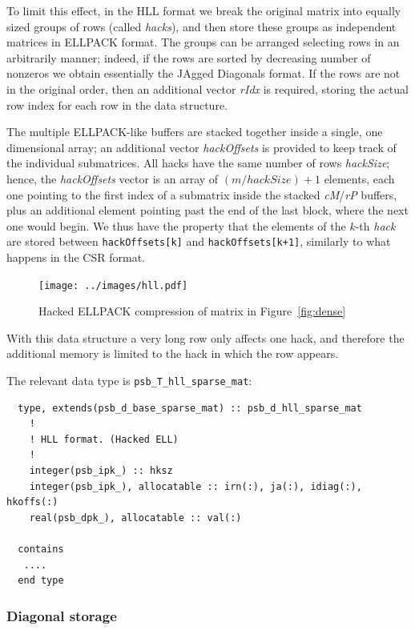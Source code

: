 To limit this effect, in the HLL format  we break the original matrix
into equally sized groups of rows (called \textit{hacks}), and then store
these groups as independent matrices in ELLPACK format. 
The groups can be arranged selecting rows in an arbitrarily manner;
indeed, if the rows are sorted by decreasing number of nonzeros we
obtain essentially the JAgged Diagonals format. 
If the rows are not in the original order, then an   additional vector
\textit{rIdx} is required, storing the actual row index  for each row
in the data structure.

The multiple ELLPACK-like buffers are stacked together inside a
single, one dimensional array; 
an additional  vector \textit{hackOffsets} is provided to keep track
of the individual submatrices.
All hacks have the same number of rows  \textit{hackSize}; hence, 
the \textit{hackOffsets} vector is  an array of
$(m/hackSize)+1$ elements, each one pointing  to the first index of a
submatrix inside the stacked \textit{cM}/\textit{rP} buffers, plus an
additional element pointing past the end of the last block, where the
next one would begin. 
We thus have the property that  
the elements of the $k$-th \textit{hack} are stored between \verb|hackOffsets[k]| and
\verb|hackOffsets[k+1]|, similarly to what happens in the CSR format. 

\begin{figure}[ht]
	\centering
	 \texttt{[image: ../images/hll.pdf]}
	\caption{Hacked ELLPACK compression of matrix in Figure~\ref{fig:dense}}
	\label{fig:hll}
\end{figure} 

With this data structure a very long row only affects one hack, and
therefore the additional memory is limited to the hack in which the
row appears.

The relevant data type is \verb|psb_T_hll_sparse_mat|:
\begin{verbatim}
  type, extends(psb_d_base_sparse_mat) :: psb_d_hll_sparse_mat
    !
    ! HLL format. (Hacked ELL) 
    !     
    integer(psb_ipk_) :: hksz
    integer(psb_ipk_), allocatable :: irn(:), ja(:), idiag(:), hkoffs(:)
    real(psb_dpk_), allocatable :: val(:)

  contains
   ....
  end type
\end{verbatim}

\subsubsection*{Diagonal storage}


